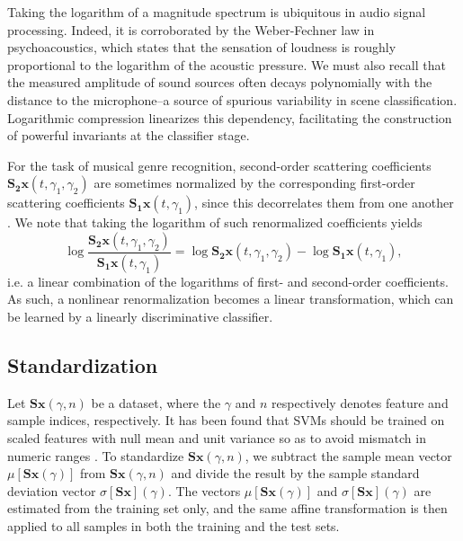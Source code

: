 \documentclass[journal]{IEEEtran}
\makeatletter
\newcommand*{\ie}{i.e.\@\xspace}
\makeatother
\begin{document}
Taking the logarithm of a magnitude spectrum is ubiquitous in audio signal processing.
Indeed, it is corroborated by the Weber-Fechner law in psychoacoustics, which states that the sensation of loudness is roughly proportional to the logarithm of the acoustic pressure. 
We must also recall that the measured amplitude of sound sources often decays polynomially with the distance to the microphone--a source of spurious variability in scene classification.
Logarithmic compression linearizes this dependency, facilitating the construction of powerful invariants at the classifier stage.

For the task of musical genre recognition, second-order scattering coefficients $\mathbf{S_2}\boldsymbol{x}(t,\gamma_1,\gamma_2)$ are sometimes normalized by the corresponding first-order scattering coefficients $\mathbf{S_1}\boldsymbol{x}(t,\gamma_1)$, since this decorrelates them from one another \cite{Anden2014}.
We note that taking the logarithm of such renormalized coefficients yields
\begin{equation}
\log \dfrac{\mathbf{S_2}\boldsymbol{x}(t,\gamma_1,\gamma_2)}{\mathbf{S_1}\boldsymbol{x}(t,\gamma_1)} =
\log \mathbf{S_2}\boldsymbol{x}(t, \gamma_1, \gamma_2) -
\log \mathbf{S_1}\boldsymbol{x}(t, \gamma_1),
\end{equation}
\ie a linear combination of the logarithms of first- and second-order coefficients.
As such, a nonlinear renormalization becomes a linear transformation, which can be learned by a linearly discriminative classifier.

\subsection{Standardization}
\label{sec:stand}

Let $\mathbf{S}\boldsymbol{x}(\gamma,n)$ be a dataset, where the $\gamma$ and $n$ respectively denotes feature and sample indices, respectively.
It has been found that SVMs should be trained on scaled features with null mean and unit variance so as to avoid mismatch in numeric ranges \cite{Hsu2003}.
To standardize $\mathbf{S}\boldsymbol{x}(\gamma,n)$, we subtract the sample mean vector $\mu[\mathbf{S}\boldsymbol{x}(\gamma)]$ from $\mathbf{S}\boldsymbol{x}(\gamma,n)$ and divide the result by the sample standard deviation vector $\sigma[\mathbf{S}\boldsymbol{x}] (\gamma)$.
The vectors $\mu[\mathbf{S}\boldsymbol{x}(\gamma)]$ and $\sigma[\mathbf{S}\boldsymbol{x}](\gamma)$ are estimated from the training set only, and the same affine transformation is then applied to all samples in both the training and the test sets.
\end{document}
